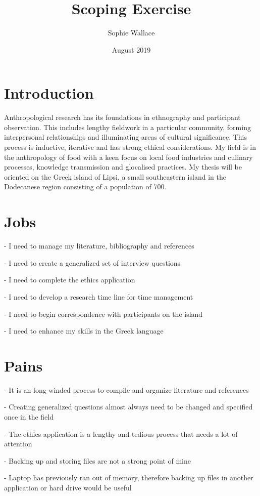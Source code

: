 \documentclass{article}
\title{Scoping Exercise}
\author{Sophie Wallace }
\date{August 2019}
\begin{document}
\maketitle

\section{Introduction}
Anthropological research has its foundations in ethnography and participant observation. This includes lengthy fieldwork in a particular community, forming interpersonal relationships and illuminating areas of cultural significance. This process is inductive, iterative and has strong ethical considerations. My field is in the anthropology of food with a keen focus on local food industries and culinary processes, knowledge transmission and glocalised practices. My thesis will be oriented on the Greek island of Lipsi, a small southeastern island in the Dodecanese region consisting of a population of 700. 
\section{Jobs}

- I need to manage my literature, bibliography and references

- I need to create a generalized set of interview questions

- I need to complete the ethics application

- I need to develop a research time line for time management

- I need to begin correspondence with participants on the island

- I need to enhance my skills in the Greek language

\section{Pains}

- It is an long-winded process to compile and organize literature and references 

- Creating generalized questions almost always need to be changed and specified once in the field

- The ethics application is a lengthy and tedious process that needs a lot of attention

- Backing up and storing files are not a strong point of mine

- Laptop has previously ran out of memory, therefore backing up files in another application or hard drive would be useful
\end{document}
